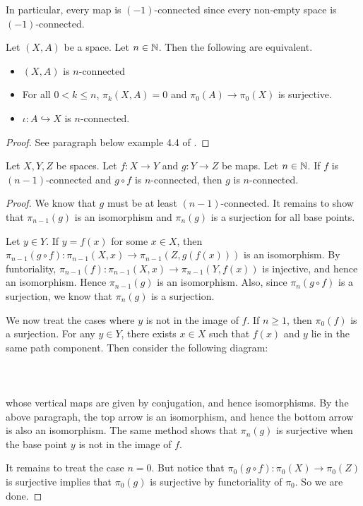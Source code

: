 In particular, every map is $(-1)$-connected since every non-empty space is $(-1)$-connected. 

\begin{prp}\label{prp:PairConnectCon} Let $(X,A)$ be a space. Let $n\in\mathbb{N}$. Then the following are equivalent. 
\begin{itemize}
\item $(X,A)$ is $n$-connected
\item For all $0<k\leq n$, $\pi_k(X,A)=0$ and $\pi_0(A)\to\pi_0(X)$ is surjective. 
\item $\iota:A\hookrightarrow X$ is $n$-connected. 
\end{itemize}
\begin{proof}
See paragraph below example 4.4 of \cite{AT}. 
\end{proof}
\end{prp}

\begin{lmm}{}{} Let $X,Y,Z$ be spaces. Let $f:X\to Y$ and $g:Y\to Z$ be maps. Let $n\in\mathbb{N}$. If $f$ is $(n-1)$-connected and $g\circ f$ is $n$-connected, then $g$ is $n$-connected. 
\begin{proof}
We know that $g$ must be at least $(n-1)$-connected. It remains to show that $\pi_{n-1}(g)$ is an isomorphism and $\pi_n(g)$ is a surjection for all base points. 

Let $y\in Y$. If $y=f(x)$ for some $x\in X$, then $\pi_{n-1}(g\circ f):\pi_{n-1}(X,x)\to\pi_{n-1}(Z,g(f(x)))$ is an isomorphism. By funtoriality, $\pi_{n-1}(f):\pi_{n-1}(X,x)\to\pi_{n-1}(Y,f(x))$ is injective, and hence an isomorphism. Hence $\pi_{n-1}(g)$ is an isomorphism. Also, since $\pi_n(g\circ f)$ is a surjection, we know that $\pi_n(g)$ is a surjection. 

We now treat the cases where $y$ is not in the image of $f$. If $n\geq 1$, then $\pi_0(f)$ is a surjection. For any $y\in Y$, there exists $x\in X$ such that $f(x)$ and $y$ lie in the same path component. Then consider the following diagram: \\~\\
\\~\\
whose vertical maps are given by conjugation, and hence isomorphisms. By the above paragraph, the top arrow is an isomorphism, and hence the bottom arrow is also an isomorphism. The same method shows that $\pi_n(g)$ is surjective when the base point $y$ is not in the image of $f$.

It remains to treat the case $n=0$. But notice that $\pi_0(g\circ f):\pi_0(X)\to\pi_0(Z)$ is surjective implies that $\pi_0(g)$ is surjective by functoriality of $\pi_0$. So we are done. 
\end{proof}
\end{lmm}

